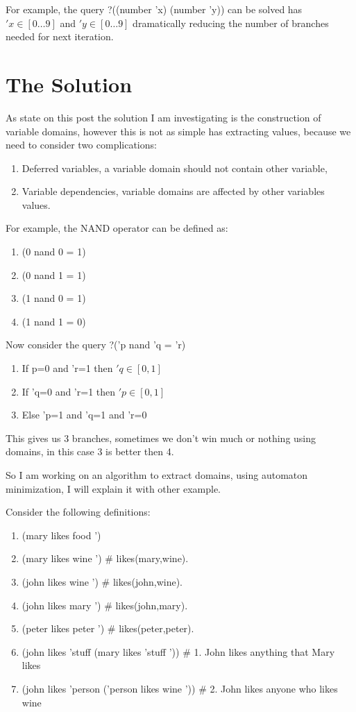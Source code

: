 \documentclass{article}
\begin{document}
For example, the query ?((number 'x) (number 'y)) can be solved has $'x \in [0 \ldots 9]$ and $'y \in [0 \ldots 9]$
dramatically reducing the number of branches needed for next iteration.


\section{The Solution}

As state on this post the solution I am investigating is the construction of variable domains, however 
this is not as simple has extracting values, because we need to consider two complications:

\begin{enumerate}
\item Deferred variables, a variable domain should not contain other variable,
\item Variable dependencies, variable domains are affected by other variables values.
\end{enumerate}

For example, the NAND operator can be defined as:

\begin{enumerate}
\item (0 nand 0 = 1)
\item (0 nand 1 = 1)
\item (1 nand 0 = 1)
\item (1 nand 1 = 0)
\end{enumerate}

Now consider the query ?('p nand 'q = 'r)

\begin{enumerate}
\item If  p=0 and 'r=1 then $'q \in [0, 1]$
\item If 'q=0 and 'r=1 then $'p \in [0, 1]$
\item Else 'p=1 and 'q=1 and 'r=0
\end{enumerate}

This gives us 3 branches, sometimes we don't win much or nothing using domains, in this case 3 is better then 4.

So I am working on an algorithm to extract domains, using automaton minimization, I will explain it with other 
example.

Consider the following definitions:
\begin{enumerate}
\item (mary likes food ')
\item (mary likes wine ') # likes(mary,wine).
\item (john likes wine ') # likes(john,wine).
\item (john likes mary ') # likes(john,mary).
\item (peter likes peter ') # likes(peter,peter).
\item (john likes 'stuff (mary likes 'stuff ')) # 1. John likes anything that Mary likes
\item (john likes 'person ('person likes wine ')) # 2. John likes anyone who likes wine
\end{enumerate}
\end{document}
